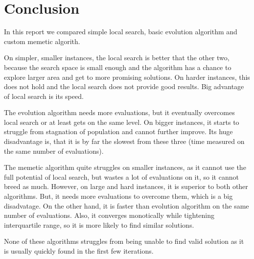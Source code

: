 \documentclass[./main.tex]{subfiles}
\begin{document}
\section{Conclusion}
In this report we compared simple local search, basic evolution algorithm and custom memetic algorith.

On simpler, smaller instances, the local search is better that the other two, because the search space is small enough and the algorithm has a chance to explore larger area and get to more promising solutions.
On harder instances, this does not hold and the local search does not provide good results.
Big advantage of local search is its speed.

The evolution algorithm needs more evaluations, but it eventually overcomes local search or at least gets on the same level.
On bigger instances, it starts to struggle from stagnation of population and cannot further improve.
Its huge disadvantage is, that it is by far the slowest from these three (time measured on the same number of evaluations).

The memetic algorithm quite struggles on smaller instances, as it cannot use the full potential of local search, but wastes a lot of evaluations on it, so it cannot breed as much.
However, on large and hard instances, it is superior to both other algorithms.
But, it needs more evaluations to overcome them, which is a big disadvatage.
On the other hand, it is faster than evolution algorithm on the same number of evaluations.
Also, it converges monotically while tightening interquartile range, so it is more likely to find similar solutions.

None of these algorithms struggles from being unable to find valid solution as it is usually quickly found in the first few iterations.
\end{document}
